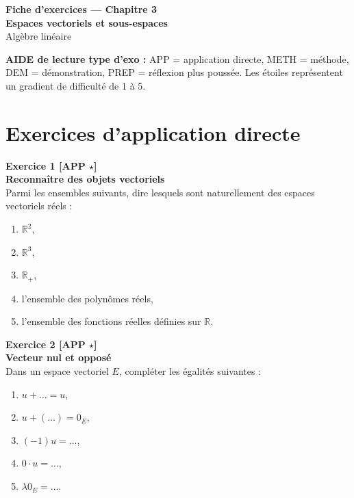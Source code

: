 \documentclass[11pt,a4paper]{article}
\begin{document}
\begin{center}
    {\LARGE \textbf{Fiche d’exercices --- Chapitre 3}}\\[0.4em]
    {\Large \textbf{Espaces vectoriels et sous-espaces}}\\[0.6em]
    Algèbre linéaire
\end{center}

\textbf{AIDE de lecture type d’exo :} APP = application directe, METH = méthode, DEM = démonstration, PREP = réflexion plus poussée. Les étoiles représentent un gradient de difficulté de 1 à 5.

\tableofcontents

\newpage

\section*{Exercices d’application directe}

\textbf{Exercice 1 [APP $\star$]}\\
\textbf{Reconnaître des objets vectoriels}\\
Parmi les ensembles suivants, dire lesquels sont naturellement des espaces vectoriels réels :
\begin{enumerate}[label=\alph*)]
    \item $\mathbb{R}^2$,
    \item $\mathbb{R}^3$,
    \item $\mathbb{R}_+$,
    \item l’ensemble des polynômes réels,
    \item l’ensemble des fonctions réelles définies sur $\mathbb{R}$.
\end{enumerate}

\textbf{Exercice 2 [APP $\star$]}\\
\textbf{Vecteur nul et opposé}\\
Dans un espace vectoriel $E$, compléter les égalités suivantes :
\begin{enumerate}[label=\alph*)]
    \item $u+ \dots = u$,
    \item $u + (\dots)=0_E$,
    \item $(-1)u = \dots$,
    \item $0\cdot u = \dots$,
    \item $\lambda 0_E = \dots$.
\end{enumerate}
\end{document}
